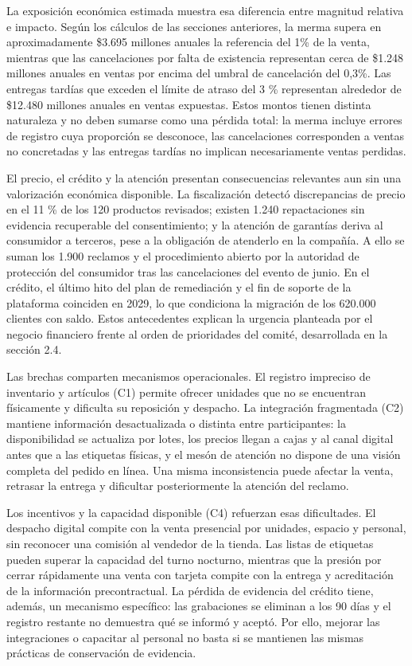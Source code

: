 \documentclass[11pt]{article}
\begin{document}
La exposición económica estimada muestra esa diferencia entre magnitud relativa e impacto. Según los cálculos de las secciones anteriores, la merma supera en aproximadamente \$3.695 millones anuales la referencia del 1\% de la venta, mientras que las cancelaciones por falta de existencia representan cerca de \$1.248 millones anuales en ventas por encima del umbral de cancelación del 0,3\%. Las entregas tardías que exceden el límite de atraso del 3 \% representan alrededor de \$12.480 millones anuales en ventas expuestas. Estos montos tienen distinta naturaleza y no deben sumarse como una pérdida total: la merma incluye errores de registro cuya proporción se desconoce, las cancelaciones corresponden a ventas no concretadas y las entregas tardías no implican necesariamente ventas perdidas.

El precio, el crédito y la atención presentan consecuencias relevantes aun sin una valorización económica disponible. La fiscalización detectó discrepancias de precio en el 11 \% de los 120 productos revisados; existen 1.240 repactaciones sin evidencia recuperable del consentimiento; y la atención de garantías deriva al consumidor a terceros, pese a la obligación de atenderlo en la compañía. A ello se suman los 1.900 reclamos y el procedimiento abierto por la autoridad de protección del consumidor tras las cancelaciones del evento de junio. En el crédito, el último hito del plan de remediación y el fin de soporte de la plataforma coinciden en 2029, lo que condiciona la migración de los 620.000 clientes con saldo. Estos antecedentes explican la urgencia planteada por el negocio financiero frente al orden de prioridades del comité, desarrollada en la sección 2.4.

Las brechas comparten mecanismos operacionales. El registro impreciso de inventario y artículos (C1) permite ofrecer unidades que no se encuentran físicamente y dificulta su reposición y despacho. La integración fragmentada (C2) mantiene información desactualizada o distinta entre participantes: la disponibilidad se actualiza por lotes, los precios llegan a cajas y al canal digital antes que a las etiquetas físicas, y el mesón de atención no dispone de una visión completa del pedido en línea. Una misma inconsistencia puede afectar la venta, retrasar la entrega y dificultar posteriormente la atención del reclamo.

Los incentivos y la capacidad disponible (C4) refuerzan esas dificultades. El despacho digital compite con la venta presencial por unidades, espacio y personal, sin reconocer una comisión al vendedor de la tienda. Las listas de etiquetas pueden superar la capacidad del turno nocturno, mientras que la presión por cerrar rápidamente una venta con tarjeta compite con la entrega y acreditación de la información precontractual. La pérdida de evidencia del crédito tiene, además, un mecanismo específico: las grabaciones se eliminan a los 90 días y el registro restante no demuestra qué se informó y aceptó. Por ello, mejorar las integraciones o capacitar al personal no basta si se mantienen las mismas prácticas de conservación de evidencia.
\end{document}
